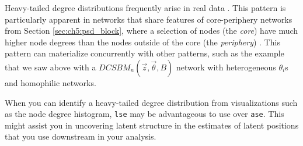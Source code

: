 Heavy-tailed degree distributions frequently arise in real data \cite{Qin2013Sep, Muldoon2016Feb, Prakash2010}. This pattern is particularly apparent in networks that share features of core-periphery networks from Section \ref{sec:ch5:psd_block}, where a selection of nodes (the \textit{core}) have much higher node degrees than the nodes outside of the core (the \textit{periphery}) \cite{Prakash2010}. This pattern can materialize concurrently with other patterns, such as the example that we saw above with a $DCSBM_n(\vec z, \vec \theta, B)$ network with heterogeneous $\theta_i$s and homophilic networks. 

When you can identify a heavy-tailed degree distribution from visualizations such as the node degree histogram, \texttt{lse} may be advantageous to use over \texttt{ase}. This might assist you in uncovering latent structure in the estimates of latent positions that you use downstream in your analysis.

